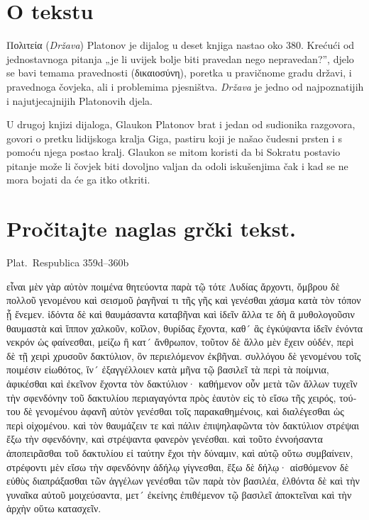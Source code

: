 
\section*{O tekstu}

Πολιτεία (\textit{Država}) Platonov je dijalog u deset knjiga nastao oko 380. Krećući od jednostavnoga pitanja „je li uvijek bolje biti pravedan nego nepravedan?'', djelo se bavi temama pravednosti (δικαιοσύνη), poretka u pravičnome gradu državi, i pravednoga čovjeka, ali i problemima pjesništva. \textit{Država} je jedno od najpoznatijih i najutjecajnijih Platonovih djela.

U drugoj knjizi dijaloga, Glaukon Platonov brat i jedan od sudionika razgovora, govori o pretku lidijskoga kralja Giga, pastiru koji je našao čudesni prsten i s pomoću njega postao kralj. Glaukon se mitom koristi da bi Sokratu postavio pitanje može li čovjek biti dovoljno valjan da odoli iskušenjima čak i kad se ne mora bojati da će ga itko otkriti.



\section*{Pročitajte naglas grčki tekst.}

Plat.\ Respublica 359d–360b


\medskip


{\large

\begin{greek}

  \noindent εἶναι μὲν γὰρ αὐτὸν ποιμένα θητεύοντα παρὰ τῷ τότε Λυδίας ἄρχοντι, ὄμβρου δὲ πολλοῦ γενομένου καὶ σεισμοῦ ῥαγῆναί τι τῆς γῆς καὶ γενέσθαι χάσμα κατὰ τὸν τόπον ᾗ ἔνεμεν. ἰδόντα δὲ καὶ θαυμάσαντα καταβῆναι καὶ ἰδεῖν ἄλλα τε δὴ ἃ μυθολογοῦσιν θαυμαστὰ καὶ ἵππον χαλκοῦν, κοῖλον, θυρίδας ἔχοντα, καθ´ ἃς ἐγκύψαντα ἰδεῖν ἐνόντα νεκρόν ὡς φαίνεσθαι, μείζω ἢ κατ´ ἄνθρωπον, τοῦτον δὲ ἄλλο μὲν ἔχειν οὐδέν, περὶ δὲ τῇ χειρὶ χρυσοῦν δακτύλιον, ὃν περιελόμενον ἐκβῆναι. συλλόγου δὲ γενομένου τοῖς ποιμέσιν εἰωθότος, ἵν´ ἐξαγγέλλοιεν κατὰ μῆνα τῷ βασιλεῖ τὰ περὶ τὰ ποίμνια, ἀφικέσθαι καὶ ἐκεῖνον ἔχοντα τὸν δακτύλιον· καθήμενον οὖν μετὰ τῶν ἄλλων τυχεῖν τὴν σφενδόνην τοῦ δακτυλίου περιαγαγόντα πρὸς ἑαυτὸν εἰς τὸ εἴσω τῆς χειρός, τούτου δὲ γενομένου ἀφανῆ αὐτὸν γενέσθαι τοῖς παρακαθημένοις, καὶ διαλέγεσθαι ὡς περὶ οἰχομένου. καὶ τὸν θαυμάζειν τε καὶ πάλιν ἐπιψηλαφῶντα τὸν δακτύλιον στρέψαι ἔξω τὴν σφενδόνην, καὶ στρέψαντα φανερὸν γενέσθαι. καὶ τοῦτο ἐννοήσαντα ἀποπειρᾶσθαι τοῦ δακτυλίου εἰ ταύτην ἔχοι τὴν δύναμιν, καὶ αὐτῷ οὕτω συμβαίνειν, στρέφοντι μὲν εἴσω τὴν σφενδόνην ἀδήλῳ γίγνεσθαι, ἔξω δὲ δήλῳ· αἰσθόμενον δὲ εὐθὺς διαπράξασθαι τῶν ἀγγέλων γενέσθαι τῶν παρὰ τὸν βασιλέα, ἐλθόντα δὲ καὶ τὴν γυναῖκα αὐτοῦ μοιχεύσαντα, μετ´ ἐκείνης ἐπιθέμενον τῷ βασιλεῖ ἀποκτεῖναι καὶ τὴν ἀρχὴν οὕτω κατασχεῖν.

\end{greek}

}


